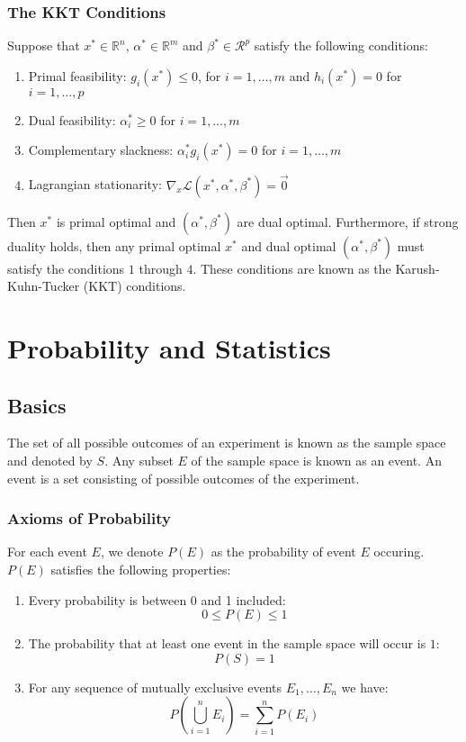\documentclass[twoside,twocolumn]{article}
\begin{document}
\subsubsection{The KKT Conditions}
Suppose that $x^* \in \mathbb{R}^n$, $\alpha^* \in \mathbb{R}^m$ and
$\beta^* \in \mathcal{R}^p$ satisfy the following conditions:
\begin{enumerate}
  \item Primal feasibility: $g_i(x^*) \leq 0$, for $i=1,\hdots, m$ and
    $h_i(x^*)=0$ for $i=1,\hdots, p$
  \item Dual feasibility: $\alpha^*_i \geq 0$ for $i=1,\hdots, m$
  \item Complementary slackness: $\alpha^*_i g_i(x^*) = 0$ for $i=1,\hdots, m$
  \item Lagrangian stationarity: $\nabla_x \mathcal{L}(x^*, \alpha^*, \beta^*) = \vec{0}$
\end{enumerate}
Then $x^*$ is primal optimal and $(\alpha^*, \beta^*)$ are dual optimal.
Furthermore, if strong duality holds, then any primal optimal $x^*$ and dual
optimal $(\alpha^*, \beta^*)$ must satisfy the conditions $1$ through $4$.
These conditions are known as the Karush-Kuhn-Tucker (KKT) conditions.
\section{Probability and Statistics}
\subsection{Basics}
The set of all possible outcomes of an experiment is known as the sample space
and denoted by $S$. Any subset $E$ of the sample space is known as an event.
An event is a set consisting of possible outcomes of the experiment.
\subsubsection{Axioms of Probability}
For each event $E$, we denote $P(E)$ as the probability of event $E$ occuring.
$P(E)$ satisfies the following properties:
\begin{enumerate}
  \item Every probability is between 0 and 1 included:
    \begin{equation} 0 \leq P(E) \leq 1 \end{equation}
  \item The probability that at least one event in the sample space will occur
  is $1$: \begin{equation} P(S) = 1 \end{equation}
  \item For any sequence of mutually exclusive events $E_1,\hdots,E_n$ we have:
    \begin{equation} P\left(\bigcup_{i=1}^nE_i\right)=\sum_{i=1}^nP(E_i) \end{equation}
\end{enumerate}
\end{document}

